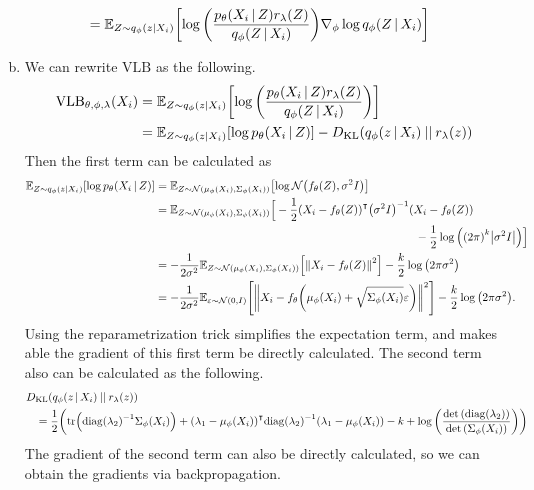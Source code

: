 \documentclass[10pt]{article}
\begin{document}
\begin{enumerate}[(a)]
\begin{align*}
        &= \mathbb{E}_{Z \sim q_{\phi}(z|X_i)}\qty[\log\qty(\frac{p_{\theta}\qty(X_i \,|\, Z)r_\lambda\qty(Z)}{q_{\phi}\qty(Z \,|\, X_i)})\nabla_{\phi}\log{q_\phi\qty(Z \,|\, X_i)}]
    \end{align*}
    \item We can rewrite $\mathrm{VLB}$ as the following.
    \begin{align*}
        \mathrm{VLB}_{\theta, \phi, \lambda}\qty(X_i) &= \mathbb{E}_{Z \sim q_\phi\qty(z|X_i)}\qty[\log\qty(\frac{p_{\theta}\qty(X_i \,|\, Z)r_\lambda\qty(Z)}{q_{\phi}\qty(Z \,|\, X_i)})] \\
        &= \mathbb{E}_{Z \sim q_\phi\qty(z|X_i)}\qty[\log p_\theta\qty(X_i \,|\, Z)] - D_{\mathrm{KL}}\qty(q_\phi\qty(z \,|\, X_i) \:||\: r_\lambda(z))
    \end{align*}
    Then the first term can be calculated as
    \begin{align*}
        \mathbb{E}_{Z \sim q_\phi\qty(z|X_i)}\qty[\log p_\theta\qty(X_i \,|\, Z)] &= \mathbb{E}_{Z \sim \mathcal{N}\qty(\mu_\phi\qty(X_i), \Sigma_\phi\qty(X_i))}\qty[\log \mathcal{N}\qty(f_\theta(Z), \sigma^2I)] \\
        &= \mathbb{E}_{Z \sim \mathcal{N}\qty(\mu_\phi\qty(X_i), \Sigma_\phi\qty(X_i))}\Big[-\frac{1}{2}\qty(X_i - f_\theta(Z))^\intercal\qty(\sigma^2I)^{-1}\qty(X_i - f_\theta(Z)) \\
        &\hspace{8cm} - \frac{1}{2}\log\qty(\qty(2\pi)^k\qty|\sigma^2I|)\Big] \\
        &= -\frac{1}{2\sigma^2}\mathbb{E}_{Z \sim \mathcal{N}\qty(\mu_\phi\qty(X_i), \Sigma_\phi\qty(X_i))}\qty[\left\lVert X_i - f_\theta\qty(Z) \right\rVert^2] - \frac{k}{2}\log\qty(2\pi\sigma^2) \\
        &= -\frac{1}{2\sigma^2}\mathbb{E}_{\varepsilon \sim \mathcal{N}\qty(0, I)}\qty[\left\lVert X_i - f_\theta\qty(\mu_\phi\qty(X_i) + \sqrt{\Sigma_\phi\qty(X_i)}\varepsilon) \right\rVert^2] - \frac{k}{2}\log\qty(2\pi\sigma^2).
    \end{align*}
    Using the reparametrization trick simplifies the expectation term, and makes able the gradient of this first term be directly calculated.
    The second term also can be calculated as the following.
    \begin{align*}
        &D_{\mathrm{KL}}\qty(q_\phi\qty(z \,|\, X_i) \:||\: r_\lambda(z)) \\
        &\hspace{3mm} = \frac{1}{2}\qty(\mathrm{tr}\qty(\mathrm{diag}\qty(\lambda_2)^{-1}\Sigma_\phi\qty(X_i)) + \qty(\lambda_1 - \mu_\phi\qty(X_i))^\intercal\mathrm{diag}\qty(\lambda_2)^{-1}\qty(\lambda_1 - \mu_\phi\qty(X_i)) - k + \log\qty(\frac{\det\qty(\mathrm{diag}\qty(\lambda_2))}{\det\qty(\Sigma_\phi\qty(X_i))}))
    \end{align*}
    The gradient of the second term can also be directly calculated, so we can obtain the gradients via backpropagation.
\end{enumerate}
\end{document}
